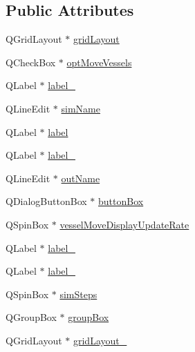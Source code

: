 \subsection*{Public Attributes}
\begin{DoxyCompactItemize}
\item 
Q\+Grid\+Layout $\ast$ \mbox{\hyperlink{class_ui___simulation_setup_dialog_a0e8d4ba427a29454956fef109f0b4482}{grid\+Layout}}
\item 
Q\+Check\+Box $\ast$ \mbox{\hyperlink{class_ui___simulation_setup_dialog_a7a0e48795ae98ef56717c34654c6146c}{opt\+Move\+Vessels}}
\item 
Q\+Label $\ast$ \mbox{\hyperlink{class_ui___simulation_setup_dialog_a81c65415851985dfd71a5f98f33104e8}{label\+\_}}
\item 
Q\+Line\+Edit $\ast$ \mbox{\hyperlink{class_ui___simulation_setup_dialog_a7bd0cddb9c69baaec47ecee675ac1d6f}{sim\+Name}}
\item 
Q\+Label $\ast$ \mbox{\hyperlink{class_ui___simulation_setup_dialog_ae08f28196aa9d9b81b353503a4eab77e}{label}}
\item 
Q\+Label $\ast$ \mbox{\hyperlink{class_ui___simulation_setup_dialog_abdc3ff6e856a0b083a55dc5c438fbcf6}{label\+\_}}
\item 
Q\+Line\+Edit $\ast$ \mbox{\hyperlink{class_ui___simulation_setup_dialog_a0407ab85ce6b1d09104d43290f900d6d}{out\+Name}}
\item 
Q\+Dialog\+Button\+Box $\ast$ \mbox{\hyperlink{class_ui___simulation_setup_dialog_ad030fd7224d9dccc45eabf48191d3246}{button\+Box}}
\item 
Q\+Spin\+Box $\ast$ \mbox{\hyperlink{class_ui___simulation_setup_dialog_ab3d4ef9a3d89c14f0cda2711e3567e86}{vessel\+Move\+Display\+Update\+Rate}}
\item 
Q\+Label $\ast$ \mbox{\hyperlink{class_ui___simulation_setup_dialog_ac752ac5502eb95977545fffb53e985c3}{label\+\_}}
\item 
Q\+Label $\ast$ \mbox{\hyperlink{class_ui___simulation_setup_dialog_a38a86ba1a537c3727f1d8c5680ca3b37}{label\+\_}}
\item 
Q\+Spin\+Box $\ast$ \mbox{\hyperlink{class_ui___simulation_setup_dialog_a5d4fc3c6a3d2ac9d460f363786ad6458}{sim\+Steps}}
\item 
Q\+Group\+Box $\ast$ \mbox{\hyperlink{class_ui___simulation_setup_dialog_abce6462084a13a2db1c3198a482abc2f}{group\+Box}}
\item 
Q\+Grid\+Layout $\ast$ \mbox{\hyperlink{class_ui___simulation_setup_dialog_a90c0c359eb24a5bcd68eb1ce038f7608}{grid\+Layout\+\_}}

\end{DoxyCompactItemize}
